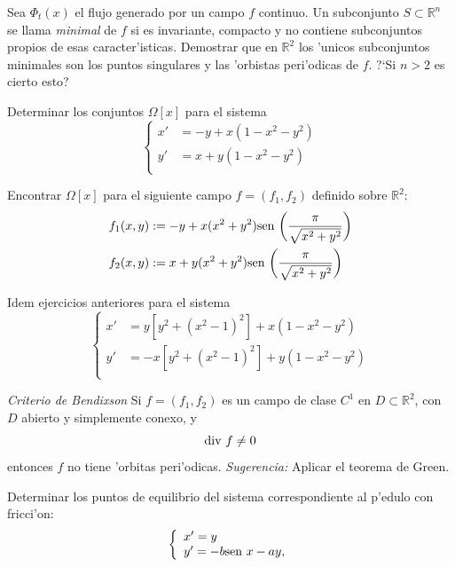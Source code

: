 \begin{ejercicio} Sea $\Phi_t(x)$ el flujo generado por un campo
$f$ continuo. Un subconjunto $S\subset\mathbb{R}^n$ se llama
\emph{minimal} de $f$ si es invariante, compacto y no contiene
subconjuntos propios de esas caracter'isticas. Demostrar que en
$\mathbb{R}^2$ los 'unicos subconjuntos minimales son los puntos
singulares y las 'orbistas peri'odicas de $f$. ?`Si $n>2$ es
cierto esto?

\end{ejercicio}

\begin{ejercicio} Determinar los conjuntos $\Omega[x]$ para el
sistema
\[
  \left\{%
\begin{array}{ll}
 x'&=-y+x(1-x^2-y^2)\\
    y'&=x+y(1-x^2-y^2)\\
\end{array}%
\right.
\]
\end{ejercicio}

\begin{ejercicio} Encontrar $\Omega[x]$ para el siguiente
campo $f=(f_1,f_2)$
 definido sobre $\mathbb{R}^2$:
\[
\begin{split}
  f_1(x,y)&:=-y+x(x^2+y^2)\hbox{sen }
  \bigg(\frac{\pi}{\sqrt{x^2+y^2}}\bigg)\\
      f_2(x,y)&:=x+y(x^2+y^2)\hbox{sen
 }\bigg(\frac{\pi}{\sqrt{x^2+y^2}}\bigg)\\
 \end{split}
\]
\end{ejercicio}

\begin{ejercicio} Idem ejercicios anteriores para el sistema
 \[
   \left\{%
 \begin{array}{ll}
  x'&=y[y^2+(x^2-1)^2]+x(1-x^2-y^2)\\
     y'&=-x[y^2+(x^2-1)^2]+y(1-x^2-y^2)\\
 \end{array}%
\right.
 \]
\end{ejercicio}

\begin{ejercicio} \emph{Criterio de Bendixson} Si $f=(f_1,f_2)$ es
un campo de clase $C^1$ en $D\subset\mathbb{R}^2$, con $D$ abierto
y simplemente conexo, y
\[
    \hbox{div }f\neq 0
\]
 entonces $f$ no tiene 'orbitas
peri'odicas. \emph{Sugerencia:} Aplicar el teorema de Green.
\end{ejercicio}
\begin{ejercicio} Determinar los puntos de equilibrio del
 sistema correspondiente al p'edulo con fricci'on:
\[
    \left\{%
\begin{array}{ll}
    x'=y \\
    y'=-b\hbox{sen }x-ay, \\
\end{array}%
\right.
\]
\end{ejercicio}




